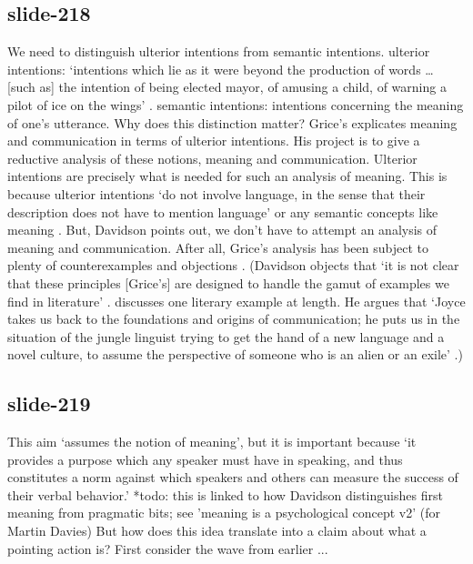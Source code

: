 \documentclass[12pt,\papersize]{extarticle}
\begin{document}
\subsection{slide-218}
We need to distinguish ulterior intentions from semantic intentions.
ulterior intentions: ‘intentions which lie as it were beyond the production of words … [such as] the intention of being elected mayor, of amusing a child, of warning a pilot of ice on the wings’ \citep[p.\ 298]{Davidson:1992pl}.
semantic intentions: intentions concerning the meaning of one’s utterance.
Why does this distinction matter?
Grice’s explicates meaning and communication in terms of ulterior intentions.
His project is to give a reductive analysis of these notions, meaning and communication.
Ulterior intentions are precisely what is needed for such an analysis of meaning.
This is because ulterior intentions ‘do not involve language, in the sense that their description does not have to mention language’ or any semantic concepts like meaning \citep[p.\ 298]{Davidson:1992pl}.
But, Davidson points out, we don’t have to attempt an analysis of meaning and communication.
After all, Grice’s analysis has been subject to plenty of counterexamples and objections \citep{Schiffer:1987zb}.
(Davidson objects that ‘it is not clear that these principles [Grice’s] are designed to handle the gamut of examples we find in literature’ \citep[p.\ 300]{Davidson:1992pl}.
\citet{Davidson:1991ic} discusses one literary example at length. He argues that ‘Joyce takes us back to the foundations and origins of communication; he puts us in the situation of the jungle linguist trying to get the hand of a new language and a novel culture, to assume the perspective of someone who is an alien or an exile’ \citep[p.\ 11]{Davidson:1991ic}.)
 
 
\subsection{slide-219}
This aim ‘assumes the notion of meaning’, but it is important because ‘it provides a purpose which any speaker must have in speaking, and thus constitutes a norm against which speakers and others can measure the success of their verbal behavior.’ \citep[p.\ 11]{Davidson:1994ol}
*todo: this is linked to how Davidson distinguishes first meaning from pragmatic bits; see 'meaning is a psychological concept v2' (for Martin Davies)
But how does this idea translate into a claim about what a pointing action is?
First consider the wave from earlier ...
 
\end{document}
